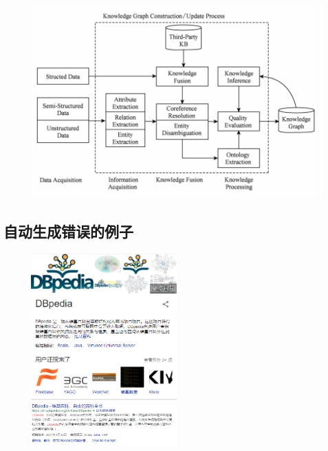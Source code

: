 \begin{frame}
	\begin{figure}[htbp]
		\centering
		\includegraphics[width=\textwidth, bb= 0 0 600 400]{pic/kg/build_kg.png}
	\end{figure}
\end{frame}

\subsection*{自动生成错误的例子}
\begin{frame}
	\begin{figure}[htbp]
		\centering
		\includegraphics[width=0.5\textwidth, bb=0 0 400 400]{pic/kg/DBpedia_1.png}
		\includegraphics[width=0.5\textwidth, bb=0 0 400 400]{pic/kg/DBpedia_2.png}
	\end{figure}
	\begin{figure}[htbp]
		\centering
		
	\end{figure}
\end{frame}
